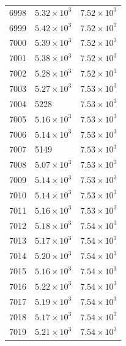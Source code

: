 \begin{table}[H]
\begin{tabular}{lll}
6998 & $\displaystyle 5.32 \times 10^{3}$ & $\displaystyle 7.52 \times 10^{3}$ \\
6999 & $\displaystyle 5.42 \times 10^{3}$ & $\displaystyle 7.52 \times 10^{3}$ \\
7000 & $\displaystyle 5.39 \times 10^{3}$ & $\displaystyle 7.52 \times 10^{3}$ \\
7001 & $\displaystyle 5.38 \times 10^{3}$ & $\displaystyle 7.52 \times 10^{3}$ \\
7002 & $\displaystyle 5.28 \times 10^{3}$ & $\displaystyle 7.52 \times 10^{3}$ \\
7003 & $\displaystyle 5.27 \times 10^{3}$ & $\displaystyle 7.53 \times 10^{3}$ \\
7004 & 5228 & $\displaystyle 7.53 \times 10^{3}$ \\
7005 & $\displaystyle 5.16 \times 10^{3}$ & $\displaystyle 7.53 \times 10^{3}$ \\
7006 & $\displaystyle 5.14 \times 10^{3}$ & $\displaystyle 7.53 \times 10^{3}$ \\
7007 & 5149 & $\displaystyle 7.53 \times 10^{3}$ \\
7008 & $\displaystyle 5.07 \times 10^{3}$ & $\displaystyle 7.53 \times 10^{3}$ \\
7009 & $\displaystyle 5.14 \times 10^{3}$ & $\displaystyle 7.53 \times 10^{3}$ \\
7010 & $\displaystyle 5.14 \times 10^{3}$ & $\displaystyle 7.53 \times 10^{3}$ \\
7011 & $\displaystyle 5.16 \times 10^{3}$ & $\displaystyle 7.53 \times 10^{3}$ \\
7012 & $\displaystyle 5.18 \times 10^{3}$ & $\displaystyle 7.54 \times 10^{3}$ \\
7013 & $\displaystyle 5.17 \times 10^{3}$ & $\displaystyle 7.54 \times 10^{3}$ \\
7014 & $\displaystyle 5.20 \times 10^{3}$ & $\displaystyle 7.54 \times 10^{3}$ \\
7015 & $\displaystyle 5.16 \times 10^{3}$ & $\displaystyle 7.54 \times 10^{3}$ \\
7016 & $\displaystyle 5.22 \times 10^{3}$ & $\displaystyle 7.54 \times 10^{3}$ \\
7017 & $\displaystyle 5.19 \times 10^{3}$ & $\displaystyle 7.54 \times 10^{3}$ \\
7018 & $\displaystyle 5.17 \times 10^{3}$ & $\displaystyle 7.54 \times 10^{3}$ \\
7019 & $\displaystyle 5.21 \times 10^{3}$ & $\displaystyle 7.54 \times 10^{3}$ \\

\end{tabular}
\end{table}
